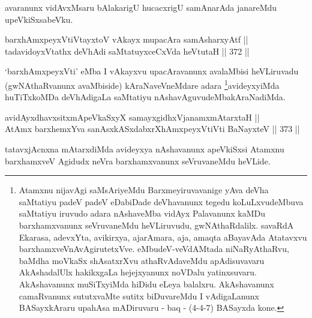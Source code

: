 \begin{artha}
avaranunx vidAvxMsaru bAlakarigU hucacxrigU samAnarAda janareMdu
upeVkiSxsabeVku.
\end{artha}


\begin{shl}
barxhAmxpeyxVtiVtayxtoV vAkayx mupacAra samAsharxyAtf || \\
tadavidoyxVtathx deVhAdi saMtatuyxceCxVda heVtutaH \hfill || 372 ||
\end{shl}


\begin{artha}
`barxhAmxpeyxVti' eMba I vAkayxvu upacAravanunx avalaMbisi heVLiruvadu
(gwNAthaRvanunx avaMbiside) kAraNaveVneMdare adara \footnote{Atamxnu nijavAgi saMsAriyeMdu Barxmeyiruvavanige yAva
deVha saMtatiyu padeV padeV eDabiDade deVhavanunx tegedu
koLuLxvudeMbuva saMtatiyu iruvudo adara nAshaveMba vidAyx
Palavanunx kaMDu barxhamxvanunx seVruvaneMdu heVLiruvudu,
gwNAthaRdalilx. savaRdA Ekarasa, adevxYta, avikirxya, ajarAmara,
aja, amaqta aBayavAda Atatavxvu
barxhamxveVnAvAgirutetxVve. eMbudeV-veVdAMtada niNaRyAthaRvu,
baMdha moVkaSx shAsatxrXvu athaRvAdaveMdu apAdisuvavaru
AkAshadalUlx hakikxgaLa hejejxyanunx noVDalu
yatinxsuvaru. AkAshavanunx muSiTxyiMda hiDidu eLeya balalxru.
AkAshavanunx camaRvanunx sututxvaMte sutitx biDuvareMdu I
vAdigaLanunx BASayxkAraru upahAsa mADiruvaru - baq - (4-4-7)
BASayxda kone.}avideyxyiMda huTiTxkoMDa deVhAdigaLa saMtatiyu
nAshavAguvudeMbakAraNadiMda.
\end{artha}




\begin{shl}
avidAyxdhavxsitxmApeVkaSxyX samayxgidhxVjanamxmAtarxtaH || \\
AtAmx barxhemxYva sanAsxkASxdabxrXhAmxpeyxVtiVti BaNayxteV \hfill || 373 ||  
\end{shl}

\begin{artha}
tatavxjAcnxna mAtarxdiMda avideyxya nAshavanunx apeVkiSxsi Atamxnu
barxhamxveV Agidudx neVra barxhamxvanunx seVruvaneMdu heVLide.
\end{artha}

